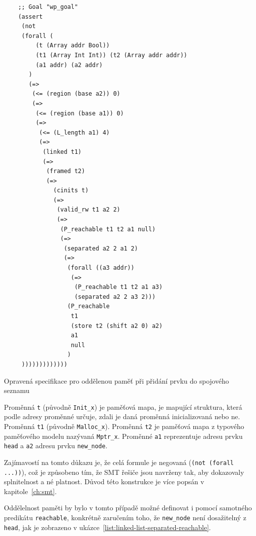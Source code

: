 \begin{listing}[H]
    \begin{verbatim}
    ;; Goal "wp_goal"
    (assert
     (not
     (forall (
         (t (Array addr Bool))
         (t1 (Array Int Int)) (t2 (Array addr addr))
         (a1 addr) (a2 addr)
       )
       (=>
        (<= (region (base a2)) 0)
        (=>
         (<= (region (base a1)) 0)
         (=>
          (<= (L_length a1) 4)
          (=>
           (linked t1)
           (=>
            (framed t2)
            (=>
              (cinits t)
              (=>
               (valid_rw t1 a2 2)
               (=>
                (P_reachable t1 t2 a1 null)
                (=>
                 (separated a2 2 a1 2)
                 (=>
                  (forall ((a3 addr))
                   (=>
                    (P_reachable t1 t2 a1 a3)
                    (separated a2 2 a3 2)))
                  (P_reachable
                   t1
                   (store t2 (shift a2 0) a2)
                   a1
                   null
                  )
     )))))))))))))
    \end{verbatim}
    \caption{Opravená specifikace pro oddělenou paměť při přidání prvku do spojového seznamu}
    \label{list:linked-list-separated-generated-proof}
\end{listing}

Proměnná \texttt{t} (původně \texttt{Init\_x}) je paměťová mapa,
je mapující struktura, která podle adresy proměnné určuje, zdali je daná proměnná inicializovaná nebo ne.
Proměnná \texttt{t1} (původně \texttt{Malloc\_x}).
Proměnná \texttt{t2} je paměťová mapa z typového paměťového modelu nazývaná \texttt{Mptr\_x}.
Proměnné \texttt{a1} reprezentuje adresu prvku \texttt{head} a \texttt{a2} adresu prvku \texttt{new\_node}.



Zajímavostí na tomto důkazu je,
že celá formule je negovaná (\texttt{(not (forall ...))}),
což je způsobeno tím, že SMT řešiče jsou navrženy tak,
aby dokazovaly splnitelnost a né platnost.
Důvod této konstrukce je více popsán v kapitole~\ref{ch:smt}.


Oddělelnost paměti by bylo v tomto případě možné definovat
i pomocí samotného predikátu \texttt{reachable},
konkrétně zaručením toho, že \texttt{new\_node} není dosažitelný z \texttt{head},
jak je zobrazeno v ukázce~\ref{list:linked-list-separated-reachable}.

